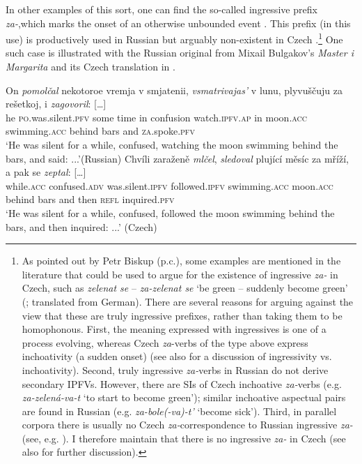 \documentclass[output=paper,colorlinks,citecolor=brown]{langscibook}
\begin{document}
In other examples of this sort, one can find the so-called ingressive prefix \textit{za-},\linebreak which marks the onset of an otherwise unbounded event \citep[see][]{isacenko62}. This prefix (in this use) is productively used in Russian but arguably non-existent in Czech \citep[see also][]{ivancev59/60,Dickey2000,petruxina00}.\footnote{As pointed out by Petr Biskup (p.c.), some examples are mentioned in the literature that could be used to argue for the existence of ingressive \textit{za-} in Czech, such as \textit{zelenat se} -- \textit{za-zelenat se} `be green -- suddenly become green' (\citealt{nadenicek11}; translated from German). There are several reasons for arguing against the view that these are truly ingressive prefixes, rather than taking them to be homophonous. First, the meaning expressed with ingressives is one of a process evolving, whereas Czech \textit{za}-verbs of the type above express inchoativity (a sudden onset) (see also \citealt{isacenko62} for a discussion of ingressivity vs. inchoativity). Second, truly ingressive \textit{za-}verbs in Russian do not derive secondary IPFVs. However, there are SIs of Czech inchoative \textit{za-}verbs (e.g. \textit{za-zelená-va-t} `to start to become green'); similar inchoative aspectual pairs are found in Russian (e.g. \textit{za-bole(-va)-t'} `become sick'). Third, in parallel corpora there is usually no Czech \textit{za-}correspondence to Russian ingressive \textit{za-} (see, e.g. \citealt{petruxina00,gehrke02}). I therefore maintain that there is no ingressive \textit{za-} in Czech (see also \citealt{gehrke22} for further discussion).} One such case is illustrated with the Russian original from Mixail Bulgakov's \textit{Master i Margarita} and its Czech translation in  \citep[][21]{gehrke22} \citep[see also][]{gehrke02}.

\ea \label{ex:po}
\ea \label{ex:poRU} 
\gll On \textit{pomolčal}          nekotoroe vremja v smjatenii, \textit{vsmatrivajas’} v lunu, plyvuščuju za rešetkoj, i    {\textit{zagovoril}: […]}\\
    he   \textsc{po}.was.silent.\textsc{pfv}  some time	     in confusion   watch.\textsc{ipfv.ap}      in moon.\textsc{acc} swimming.\textsc{acc} behind bars and \textsc{za}.spoke.\textsc{pfv}\\
    \glt `He was silent for a while, confused, watching the moon swimming behind the bars, and said: ...'\hfill (Russian)
\ex 
\gll Chvíli     zaraženě \textit{mlčel},           \textit{sledoval}      plující měsíc               za mříží, a    pak    se    {\textit{zeptal}: […]}\\
 while.\textsc{acc} confused.\textsc{adv}    was.silent.\textsc{ipfv} followed.\textsc{ipfv} swimming.\textsc{acc} moon.\textsc{acc} behind bars and then     \textsc{refl} inquired.\textsc{pfv}\\
    \glt`He was silent for a while, confused, followed the moon swimming behind the bars, and then inquired: ...' \hfill (Czech)\label{ex:poCZ}
\z 
\z 
\end{document}
